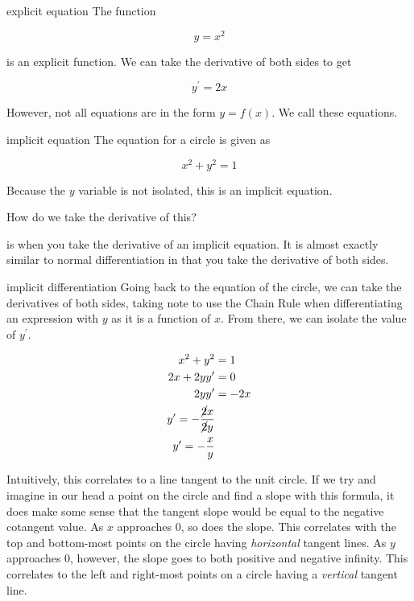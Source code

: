 \begin{example}{explicit equation}
    The function
    
    \[ y = x^2 \]
    
    is an explicit function. We can take the derivative of both sides to get
    
    \[ y^\prime = 2x \]
\end{example}

However, not all equations are in the form \( y = f \left( x \right) \). We call these  equations.

\begin{example}{implicit equation}
    The equation for a circle is given as
    
    \[ x^2 + y^2 = 1 \]
    
    Because the \( y \) variable is not isolated, this is an implicit equation.
\end{example}

How do we take the derivative of this?

 is when you take the derivative of an implicit equation. It is almost exactly similar to normal differentiation in that you take the derivative of both sides.

\begin{example}{implicit differentiation}
    Going back to the equation of the circle, we can take the derivatives of both sides, taking note to use the Chain Rule when differentiating an expression with \( y \) as it is a function of \( x \). From there, we can isolate the value of \( y^\prime \).
    
    \begin{align}
        x^2 + y^2 &= 1 \\
        2x + 2y y^\prime &= 0 \\
        2y y^\prime &= -2x \\
        y^\prime = -\dfrac{\cancel{2}x}{\cancel{2}y} \\
        y^\prime = -\dfrac{x}{y}
    \end{align}
    
    Intuitively, this correlates to a line tangent to the unit circle. If we try and imagine in our head a point on the circle and find a slope with this formula, it does make some sense that the tangent slope would be equal to the negative cotangent value. As \( x \) approaches \( 0 \), so does the slope. This correlates with the top and bottom-most points on the circle having \textit{horizontal} tangent lines. As \( y \) approaches \( 0 \), however, the slope goes to both positive and negative infinity. This correlates to the left and right-most points on a circle having a \textit{vertical} tangent line.
\end{example}

